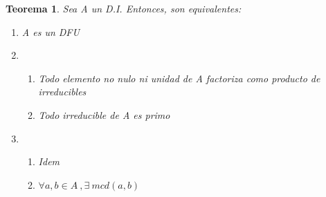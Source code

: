 \documentclass[11pt, a4paper, titlepage]{article}
\newif\IfInSansMode
\theoremstyle{theorem-style}
\newtheorem{nth}{Teorema}[section]
\theoremstyle{definition-style}
\theoremstyle{remark-style}
\theoremstyle{example-style}
\newenvironment{nlist}
{\begin{enumerate}
\renewcommand\labelenumi{(\emph{\roman{enumi})}}}
{\end{enumerate}}
\begin{document}
\begin{nth}
	Sea A un D.I. Entonces, son equivalentes:
	\begin{nlist}
	\item A es un DFU
	\item \begin{enumerate}
	\item Todo elemento no nulo ni unidad de A factoriza como producto de irreducibles
	\item Todo irreducible de A es primo
\end{enumerate}
	\item \begin{enumerate}
	\item Idem
	\item $\forall a,b \in A \ , \exists \ mcd(a,b)$
\end{enumerate}
\end{nlist}
\end{nth}
\end{document}
